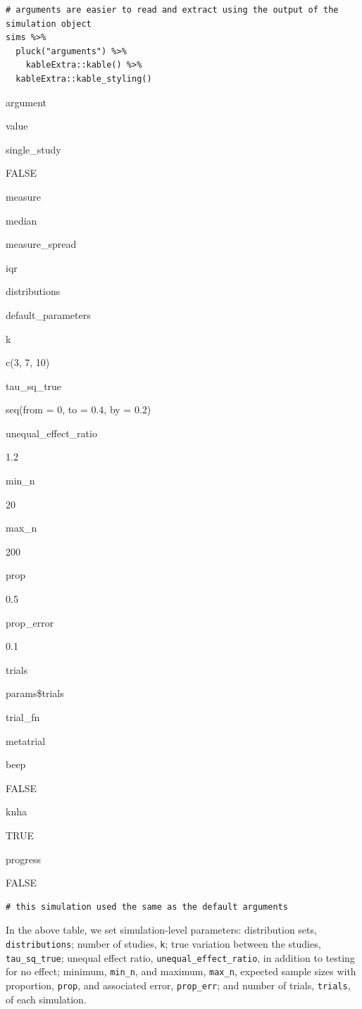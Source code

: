 \documentclass[
]{article}
\begin{document}
\begin{verbatim}
# arguments are easier to read and extract using the output of the simulation object
sims %>% 
  pluck("arguments") %>% 
    kableExtra::kable() %>% 
  kableExtra::kable_styling()
\end{verbatim}

argument

value

single\_study

FALSE

measure

median

measure\_spread

iqr

distributions

default\_parameters

k

c(3, 7, 10)

tau\_sq\_true

seq(from = 0, to = 0.4, by = 0.2)

unequal\_effect\_ratio

1.2

min\_n

20

max\_n

200

prop

0.5

prop\_error

0.1

trials

params\$trials

trial\_fn

metatrial

beep

FALSE

knha

TRUE

progress

FALSE

\begin{verbatim}
# this simulation used the same as the default arguments
\end{verbatim}

In the above table, we set simulation-level parameters: distribution
sets, \texttt{distributions}; number of studies, \texttt{k}; true
variation between the studies, \texttt{tau\_sq\_true}; unequal effect
ratio, \texttt{unequal\_effect\_ratio}, in addition to testing for no
effect; minimum, \texttt{min\_n}, and maximum, \texttt{max\_n}, expected
sample sizes with proportion, \texttt{prop}, and associated error,
\texttt{prop\_err}; and number of trials, \texttt{trials}, of each
simulation.
\end{document}
